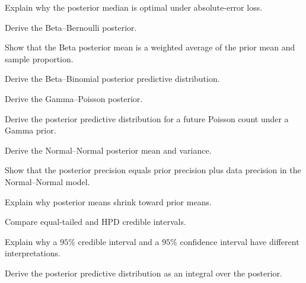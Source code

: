 \begin{exercise}[2]
Explain why the posterior median is optimal under absolute-error loss.
\end{exercise}

\begin{exercise}[3]
Derive the Beta--Bernoulli posterior.
\end{exercise}

\begin{exercise}[3]
Show that the Beta posterior mean is a weighted average of the prior mean
and sample proportion.
\end{exercise}

\begin{exercise}[3]
Derive the Beta--Binomial posterior predictive distribution.
\end{exercise}

\begin{exercise}[3]
Derive the Gamma--Poisson posterior.
\end{exercise}

\begin{exercise}[3]
Derive the posterior predictive distribution for a future Poisson count
under a Gamma prior.
\end{exercise}

\begin{exercise}[3]
Derive the Normal--Normal posterior mean and variance.
\end{exercise}

\begin{exercise}[3]
Show that the posterior precision equals prior precision plus data
precision in the Normal--Normal model.
\end{exercise}

\begin{exercise}[3]
Explain why posterior means shrink toward prior means.
\end{exercise}

\begin{exercise}[3]
Compare equal-tailed and HPD credible intervals.
\end{exercise}

\begin{exercise}[3]
Explain why a \(95\%\) credible interval and a \(95\%\) confidence
interval have different interpretations.
\end{exercise}

\begin{exercise}[3]
Derive the posterior predictive distribution as an integral over the
posterior.
\end{exercise}

